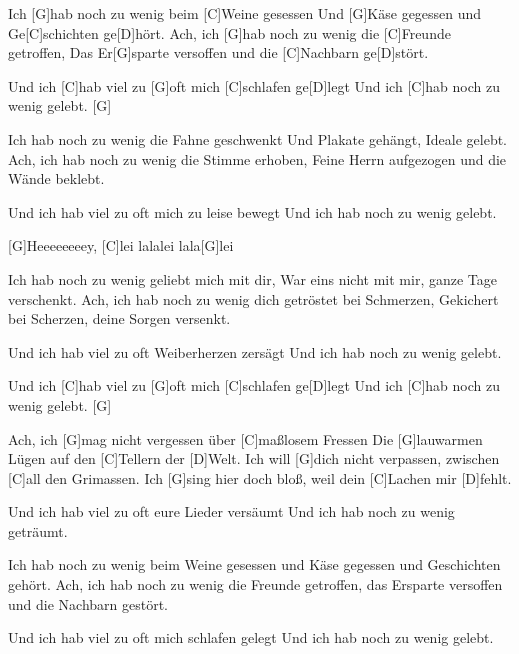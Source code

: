 



\begin{guitar}\vspace{-0.5em}
	Ich [G]hab noch zu wenig beim [C]Weine gesessen
	Und [G]Käse gegessen und Ge[C]schichten ge[D]hört.
	Ach, ich [G]hab noch zu wenig die [C]Freunde getroffen,
	Das Er[G]sparte versoffen und die [C]Nachbarn ge[D]stört.
	
	Und ich [C]hab viel zu [G]oft mich [C]schlafen ge[D]legt
	Und ich [C]hab noch zu wenig gelebt. [G]{}
	
	Ich hab noch zu wenig die Fahne geschwenkt
	Und Plakate gehängt, Ideale gelebt.
	Ach, ich hab noch zu wenig die Stimme erhoben,
	Feine Herrn aufgezogen und die Wände beklebt.
	
	Und ich hab viel zu oft mich zu leise bewegt
	Und ich hab noch zu wenig gelebt.
	
	[G]Heeeeeeeey, [C]lei lalalei lala[G]lei 
	
	Ich hab noch zu wenig geliebt mich mit dir,
	War eins nicht mit mir, ganze Tage verschenkt.
	Ach, ich hab noch zu wenig dich getröstet bei Schmerzen,
	Gekichert bei Scherzen, deine Sorgen versenkt.
	
	Und ich hab viel zu oft Weiberherzen zersägt
	Und ich hab noch zu wenig gelebt.
	
	 
	
	Und ich [C]hab viel zu [G]oft mich [C]schlafen ge[D]legt
	Und ich [C]hab noch zu wenig gelebt. [G]{}
	
	Ach, ich [G]mag nicht vergessen über [C]maßlosem Fressen
	Die [G]lauwarmen Lügen auf den [C]Tellern der [D]Welt.
	Ich will [G]dich nicht verpassen, zwischen [C]all den Grimassen.
	Ich [G]sing hier doch bloß, weil dein [C]Lachen mir [D]fehlt.
	
	Und ich hab viel zu oft eure Lieder versäumt
	Und ich hab noch zu wenig geträumt.
	
	Ich hab noch zu wenig beim Weine gesessen
	und Käse gegessen und Geschichten gehört.
	Ach, ich hab noch zu wenig die Freunde getroffen,
	das Ersparte versoffen und die Nachbarn gestört.
	
	Und ich hab viel zu oft mich schlafen gelegt
	Und ich hab noch zu wenig gelebt.
\end{guitar}